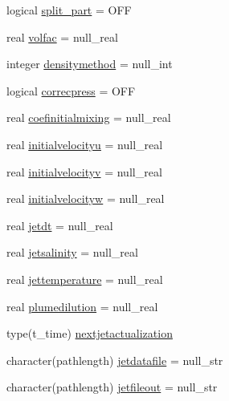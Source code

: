 \begin{DoxyCompactItemize}
\item 
logical \mbox{\hyperlink{structmodulelagrangianglobal_1_1t__movement_a275750e771729ffef43f3ce6e62b1bdf}{split\+\_\+part}} = O\+FF
\item 
real \mbox{\hyperlink{structmodulelagrangianglobal_1_1t__movement_ac2e80a8ba8514491fdefcf997d565af4}{volfac}} = null\+\_\+real
\item 
integer \mbox{\hyperlink{structmodulelagrangianglobal_1_1t__movement_abfee5406e9c20865978a8ddcdb5b0c92}{densitymethod}} = null\+\_\+int
\item 
logical \mbox{\hyperlink{structmodulelagrangianglobal_1_1t__movement_a23b9875e26ebb499c4dcfd9be129837e}{correcpress}} = O\+FF
\item 
real \mbox{\hyperlink{structmodulelagrangianglobal_1_1t__movement_a43590cf8c8751d79fb206f45a2b47f5d}{coefinitialmixing}} = null\+\_\+real
\item 
real \mbox{\hyperlink{structmodulelagrangianglobal_1_1t__movement_acad255a418af494e1aa0bf2f638164d6}{initialvelocityu}} = null\+\_\+real
\item 
real \mbox{\hyperlink{structmodulelagrangianglobal_1_1t__movement_ae1c2f58a58dd562ed8f779b455273365}{initialvelocityv}} = null\+\_\+real
\item 
real \mbox{\hyperlink{structmodulelagrangianglobal_1_1t__movement_ac584fe9bb94bbee200f290d0e7e19656}{initialvelocityw}} = null\+\_\+real
\item 
real \mbox{\hyperlink{structmodulelagrangianglobal_1_1t__movement_a282c8a271e161a3fee63dc1bfaa448f3}{jetdt}} = null\+\_\+real
\item 
real \mbox{\hyperlink{structmodulelagrangianglobal_1_1t__movement_a611c883a9dd3bc9ea14989bd29908745}{jetsalinity}} = null\+\_\+real
\item 
real \mbox{\hyperlink{structmodulelagrangianglobal_1_1t__movement_ad7e04b6c0012b3ff6914d8b9ee2e890d}{jettemperature}} = null\+\_\+real
\item 
real \mbox{\hyperlink{structmodulelagrangianglobal_1_1t__movement_ab8710dd3bb5aafe331edced109e54871}{plumedilution}} = null\+\_\+real
\item 
type(t\+\_\+time) \mbox{\hyperlink{structmodulelagrangianglobal_1_1t__movement_a2370e96db16394053edf932e0f630d3c}{nextjetactualization}}
\item 
character(pathlength) \mbox{\hyperlink{structmodulelagrangianglobal_1_1t__movement_aaf531910e924936b3d88e7aa88a929c1}{jetdatafile}} = null\+\_\+str
\item 
character(pathlength) \mbox{\hyperlink{structmodulelagrangianglobal_1_1t__movement_ab86b8aa9505bb79b8652cfc8291adbd6}{jetfileout}} = null\+\_\+str

\end{DoxyCompactItemize}
